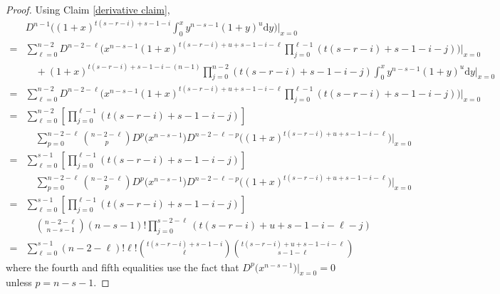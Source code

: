 \documentclass[11pt]{amsart}
\theoremstyle{definition}
\newcommand{\0}{\emptyset}
\begin{document}
\begin{proof}
Using Claim \ref{derivative claim},
\begin{align*}
    &D^{n-1}\Big((1+x)^{t(s-r-i)+s-1-i}\int_0^xy^{n-s-1}(1+y)^u\mathrm{d}y\Big)\Big\rvert_{x=0}\\
    =&\sum_{\ell=0}^{n-2}D^{n-2-\ell}\Big(x^{n-s-1}(1+x)^{t(s-r-i)+u+s-1-i-\ell}\prod_{j=0}^{\ell-1}(t(s-r-i)+s-1-i-j)\Big)\Big\rvert_{x=0}\\
    &\quad+(1+x)^{t(s-r-i)+s-1-i-(n-1)}\prod_{j=0}^{n-2}(t(s-r-i)+s-1-i-j)\int_0^xy^{n-s-1}(1+y)^u\mathrm{d}y\Big\rvert_{x=0}\\
    =&\sum_{\ell=0}^{n-2}D^{n-2-\ell}\Big(x^{n-s-1}(1+x)^{t(s-r-i)+u+s-1-i-\ell}\prod_{j=0}^{\ell-1}(t(s-r-i)+s-1-i-j)\Big)\Big\rvert_{x=0}\\
    =&\sum_{\ell=0}^{n-2}\left[\prod_{j=0}^{\ell-1}(t(s-r-i)+s-1-i-j)\right]\\
    &\quad\sum_{p=0}^{n-2-\ell}\binom{n-2-\ell}{p}D^p\big(x^{n-s-1}\big)D^{n-2-\ell-p}\big((1+x)^{t(s-r-i)+u+s-1-i-\ell}\big)\Big\rvert_{x=0}\\
    =&\sum_{\ell=0}^{s-1}\left[\prod_{j=0}^{\ell-1}(t(s-r-i)+s-1-i-j)\right]\\
    &\quad\sum_{p=0}^{n-2-\ell}\binom{n-2-\ell}{p}D^p\big(x^{n-s-1}\big)D^{n-2-\ell-p}\big((1+x)^{t(s-r-i)+u+s-1-i-\ell}\big)\Big\rvert_{x=0}\\
    =&\sum_{\ell=0}^{s-1}\left[\prod_{j=0}^{\ell-1}(t(s-r-i)+s-1-i-j)\right]\\
    &\quad\binom{n-2-\ell}{n-s-1}(n-s-1)!\prod_{j=0}^{s-2-\ell}(t(s-r-i)+u+s-1-i-\ell-j)\\
    =&\sum_{\ell=0}^{s-1}(n-2-\ell)!\ell!\binom{t(s-r-i)+s-1-i}{\ell}\binom{t(s-r-i)+u+s-1-i-\ell}{s-1-\ell}
\end{align*}
where the fourth and fifth equalities use the fact that
$D^p\big(x^{n-s-1}\big)\Big\rvert_{x=0}=0$
unless $p=n-s-1$.
\end{proof}



\end{document}
